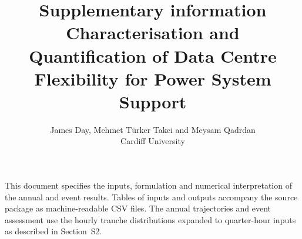 \documentclass[11pt,a4paper]{article}
\title{Supplementary information\\\large Characterisation and Quantification of Data Centre Flexibility for Power System Support}
\author{James Day, Mehmet T\"urker Takci and Meysam Qadrdan\\Cardiff University}
\date{}
\begin{document}
\raggedbottom
\maketitle
\noindent This document specifies the inputs, formulation and numerical interpretation of the annual and event results. Tables of inputs and outputs accompany the source package as machine-readable CSV files. The annual trajectories and event assessment use the hourly tranche distributions expanded to quarter-hour inputs as described in Section~S2.





\renewcommand{\bibfont}{\small}

\end{document}
